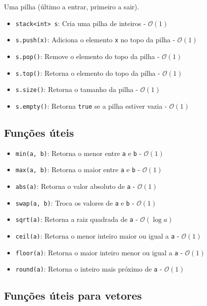 \documentclass[10pt, a4paper, oneside]{book}
\begin{document}
Uma pilha (último a entrar, primeiro a sair).

\begin{itemize}
    \item \texttt{stack<int> s}: Cria uma pilha de inteiros - $\mathcal{O}(1)$
    \item \texttt{s.push(x)}: Adiciona o elemento \texttt{x} no topo da pilha - $\mathcal{O}(1)$
    \item \texttt{s.pop()}: Remove o elemento do topo da pilha - $\mathcal{O}(1)$
    \item \texttt{s.top()}: Retorna o elemento do topo da pilha - $\mathcal{O}(1)$
    \item \texttt{s.size()}: Retorna o tamanho da pilha - $\mathcal{O}(1)$
    \item \texttt{s.empty()}: Retorna \texttt{true} se a pilha estiver vazia - $\mathcal{O}(1)$
\end{itemize}

\subsection{Funções úteis}

\begin{itemize}
    \item \texttt{min(a, b)}: Retorna o menor entre \texttt{a} e \texttt{b} - $\mathcal{O}(1)$
    \item \texttt{max(a, b)}: Retorna o maior entre \texttt{a} e \texttt{b} - $\mathcal{O}(1)$
    \item \texttt{abs(a)}: Retorna o valor absoluto de \texttt{a} - $\mathcal{O}(1)$
    \item \texttt{swap(a, b)}: Troca os valores de \texttt{a} e \texttt{b} - $\mathcal{O}(1)$
    \item \texttt{sqrt(a)}: Retorna a raiz quadrada de \texttt{a} - $\mathcal{O}(\log a)$
    \item \texttt{ceil(a)}: Retorna o menor inteiro maior ou igual a \texttt{a} - $\mathcal{O}(1)$
    \item \texttt{floor(a)}: Retorna o maior inteiro menor ou igual a \texttt{a} - $\mathcal{O}(1)$
    \item \texttt{round(a)}: Retorna o inteiro mais próximo de \texttt{a} - $\mathcal{O}(1)$
\end{itemize}

\subsection{Funções úteis para vetores}
\end{document}
